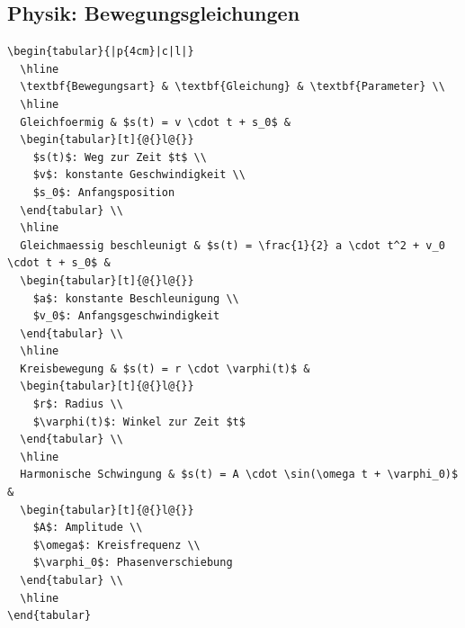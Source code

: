 \documentclass[12pt,a4paper]{article}
\begin{document}
\subsection{Physik: Bewegungsgleichungen}

\begin{lstlisting}[style=latex]
\begin{tabular}{|p{4cm}|c|l|}
  \hline
  \textbf{Bewegungsart} & \textbf{Gleichung} & \textbf{Parameter} \\
  \hline
  Gleichfoermig & $s(t) = v \cdot t + s_0$ & 
  \begin{tabular}[t]{@{}l@{}}
    $s(t)$: Weg zur Zeit $t$ \\
    $v$: konstante Geschwindigkeit \\
    $s_0$: Anfangsposition
  \end{tabular} \\
  \hline
  Gleichmaessig beschleunigt & $s(t) = \frac{1}{2} a \cdot t^2 + v_0 \cdot t + s_0$ & 
  \begin{tabular}[t]{@{}l@{}}
    $a$: konstante Beschleunigung \\
    $v_0$: Anfangsgeschwindigkeit
  \end{tabular} \\
  \hline
  Kreisbewegung & $s(t) = r \cdot \varphi(t)$ & 
  \begin{tabular}[t]{@{}l@{}}
    $r$: Radius \\
    $\varphi(t)$: Winkel zur Zeit $t$
  \end{tabular} \\
  \hline
  Harmonische Schwingung & $s(t) = A \cdot \sin(\omega t + \varphi_0)$ & 
  \begin{tabular}[t]{@{}l@{}}
    $A$: Amplitude \\
    $\omega$: Kreisfrequenz \\
    $\varphi_0$: Phasenverschiebung
  \end{tabular} \\
  \hline
\end{tabular}
\end{lstlisting}
\end{document}
